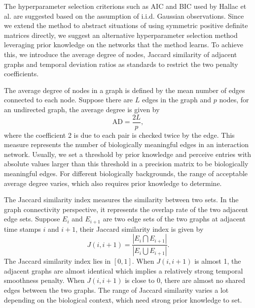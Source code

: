 The hyperparameter selection criterions such as AIC and BIC used by Hallac et al.\cite{hallac2017networkinferencetimevaryinggraphical}
are suggested based on the assumption of i.i.d. Gaussian observations. 
Since we extend the method to abstract situations of using symmetric positive definite matrices directly, 
we suggest an alternative hyperparameter selection method leveraging prior knowledge on the networks 
that the method learns. 
To achieve this, we introduce the average degree of nodes, Jaccard similarity of adjacent graphs and temporal deviation ratios as standards to restrict the two penalty coefficients. 

The average degree of nodes in a graph is defined by the mean number of edges connected to each node. 
Suppose there are $L$ edges in the graph and $p$ nodes, for an undirected graph, 
the average degree is given by 
\begin{equation*}
    \text{AD} = \frac{2L}{p}, 
\end{equation*}
where the coefficient 2 is due to each pair is checked twice by the edge. 
This measure represents the number of biologically meaningful edges in an interaction network. 
Usually, we set a threshold by prior knowledge and perceive entries with absolute values larger than this threshold in a precision matrix to be biologically 
meaningful edges. 
For different biologically backgrounds, the range of acceptable average degree varies, 
which also requires prior knowledge to determine.

The Jaccard similarity index measures the similarity between two sets. 
In the graph connectivity perspective, it represents the overlap rate of the two adjacent edge sets. 
Suppose $E_i$ and $E_{i+1}$ are two edge sets of the two graphs at adjacent time stamps $i$ and $i+1$, 
their Jaccard similarity index is given by 
\begin{equation*}
    J(i,i+1) = \frac{|E_i\bigcap E_{i+1}|}{|E_i\bigcup E_{i+1}|}.
\end{equation*} 
The Jaccard similarity index lies in $[0,1]$. 
When $J(i,i+1)$ is almost 1, the adjacent graphs are almost identical which implies a relatively strong temporal smoothness penalty. 
When $J(i,i+1)$ is close to 0, there are almost no shared edges between the two graphs. 
The range of Jaccard similarity varies a lot depending on the biological context, 
which need strong prior knowledge to set.

